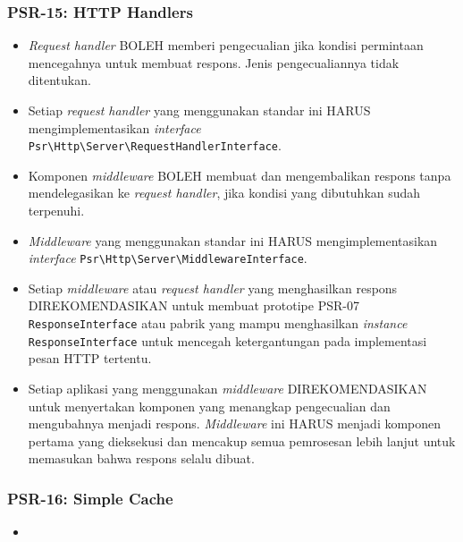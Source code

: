 \subsubsection{PSR-15: HTTP Handlers}
\label{subsubsec:psr15}
\begin{itemize}
	\item \textit{Request handler} BOLEH memberi pengecualian jika kondisi permintaan mencegahnya untuk membuat respons. Jenis pengecualiannya tidak ditentukan.
	\item Setiap \textit{request handler} yang menggunakan standar ini HARUS mengimplementasikan \textit{interface} \verb|Psr\Http\Server\RequestHandlerInterface|.
	\item Komponen \textit{middleware} BOLEH membuat dan mengembalikan respons tanpa mendelegasikan ke \textit{request handler}, jika kondisi yang dibutuhkan sudah terpenuhi.
	\item \textit{Middleware} yang menggunakan standar ini HARUS mengimplementasikan \textit{interface} \verb|Psr\Http\Server\MiddlewareInterface|.
	\item Setiap \textit{middleware} atau \textit{request handler} yang menghasilkan respons DIREKOMENDASIKAN untuk membuat prototipe PSR-07 \verb|ResponseInterface| atau pabrik yang mampu menghasilkan \textit{instance} \verb|ResponseInterface| untuk mencegah ketergantungan pada implementasi pesan HTTP tertentu.
	\item Setiap aplikasi yang menggunakan \textit{middleware} DIREKOMENDASIKAN untuk menyertakan komponen yang menangkap pengecualian dan mengubahnya menjadi respons. \textit{Middleware} ini HARUS menjadi komponen pertama yang dieksekusi dan mencakup semua pemrosesan lebih lanjut untuk memasukan bahwa respons selalu dibuat. 
\end{itemize}

\subsubsection{PSR-16: Simple Cache}
\label{subsubsec:psr16}
\begin{itemize}
	\item
\end{itemize}


